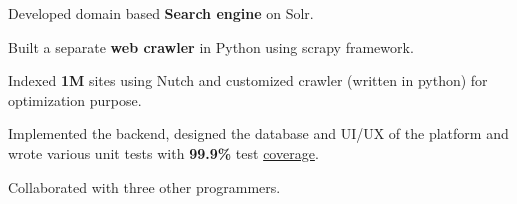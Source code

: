 \documentclass[a4paper]{deedy-resume-openfont}
\begin{document}
\begin{minipage}[t]{0.63\textwidth}
\begin{tightemize}
\item Developed domain based \textbf{Search engine} on Solr.
\item Built a separate \textbf{web crawler} in Python using scrapy framework.
\item Indexed \textbf{1M} sites using Nutch and customized crawler (written in python) for optimization purpose.
\end{tightemize}
\sectionsep


\begin{tightemize}
\item Implemented the backend, designed the database and UI/UX of the platform and wrote various unit tests with \textbf{99.9\%} test \href{https://coveralls.io/github/hirenchalodiya1/agrisync}{coverage}.
\item Collaborated with three other programmers.
\end{tightemize}
\sectionsep



\end{minipage}
\end{document}
